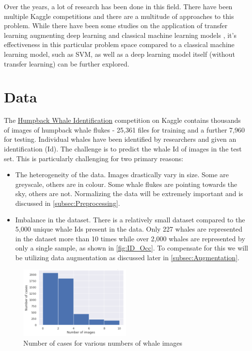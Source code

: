 \documentclass[paper=a4, fontsize=11pt]{scrartcl}
\numberwithin{equation}{section}		%
\numberwithin{table}{section}				%
\begin{document}
Over the years, a lot of research has been done in this field. There have been multiple Kaggle competitions and there are a multitude of approaches to this problem. While there have been some studies on the application of transfer learning augmenting deep learning and classical machine learning models \cite{YuanHongchun2020AAIC}, it's effectiveness in this particular problem space compared to a classical machine learning model, such as SVM, as well as a deep learning model itself (without transfer learning) can be further explored.

\section{Data}\label{sec: data}

The \href{https://www.kaggle.com/competitions/humpback-whale-identification/overview}{Humpback Whale Identification} competition on Kaggle contains thousands of images of humpback whale flukes - 25,361 files for training and a further 7,960 for testing. Individual whales have been identified by researchers and given an identification (Id). The challenge is to predict the whale Id of images in the test set. This is particularly challenging for two primary reasons:
\begin{itemize}
  \item The heterogeneity of the data. Images drastically vary in size. Some are greyscale, others are in colour. Some whale flukes are pointing towards the sky, others are not. Normalizing the data will be extremely important and is discussed in \autoref{subsec:Preprocessing}.
  \item Imbalance in the dataset. There is a relatively small dataset compared to the 5,000 unique whale Ids present in the data. Only 227 whales are represented in the dataset more than 10 times while over 2,000 whales are represented by only a single sample, as shown in \autoref{fig:ID_Occ}. To compensate for this we will be utilizing data augmentation as discussed later in \autoref{subsec:Augmentation}.
\end{itemize}

\begin{figure}[H]
    \centering
    \includegraphics[width=0.5\textwidth]{ID_Occurences.png}
    \caption{Number of  cases for various numbers of whale images}
    \label{fig:ID_Occ}
\end{figure}
\end{document}
